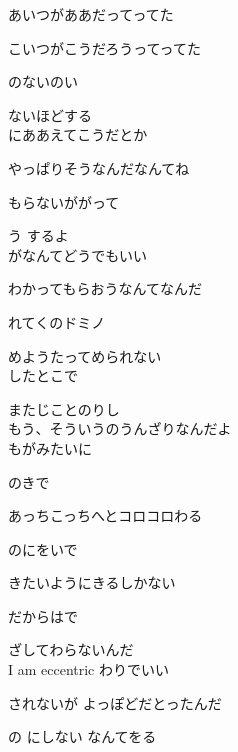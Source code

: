あいつがああだってってた

こいつがこうだろうってってた

のないのい

ないほどする
\\

にああえてこうだとか

やっぱりそうなんだなんてね

もらないががって

う するよ
\\

がなんてどうでもいい

わかってもらおうなんてなんだ

れてくのドミノ

めようたってめられない
\\

したとこで

またじことのりし
\\

もう、そういうのうんざりなんだよ
\\

もがみたいに

のきで

あっちこっちへとコロコロわる

のにをいで

きたいようにきるしかない

だからはで

ざしてわらないんだ
\\

I am eccentric わりでいい

されないが よっぽどだとったんだ

の にしない なんてをる

